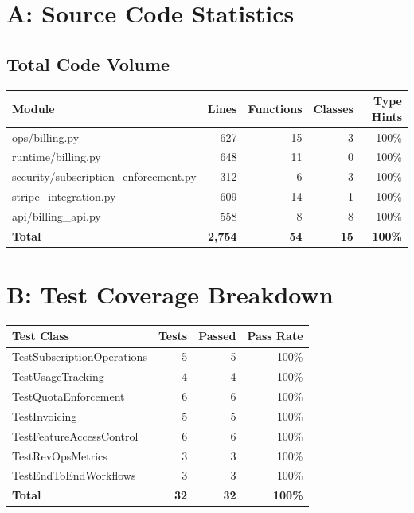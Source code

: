 \documentclass[12pt]{report}
\begin{document}
\appendix

\chapter{A: Source Code Statistics}

\section{Total Code Volume}

\begin{table}[h]
\centering
\begin{tabular}{lrrrr}
\toprule
\textbf{Module} & \textbf{Lines} & \textbf{Functions} & \textbf{Classes} & \textbf{Type Hints} \\
\midrule
ops/billing.py & 627 & 15 & 3 & 100\% \\
runtime/billing.py & 648 & 11 & 0 & 100\% \\
security/subscription\_enforcement.py & 312 & 6 & 3 & 100\% \\
stripe\_integration.py & 609 & 14 & 1 & 100\% \\
api/billing\_api.py & 558 & 8 & 8 & 100\% \\
\bottomrule
\textbf{Total} & \textbf{2,754} & \textbf{54} & \textbf{15} & \textbf{100\%} \\
\bottomrule
\end{tabular}
\end{table}

\chapter{B: Test Coverage Breakdown}

\begin{table}[h]
\centering
\begin{tabular}{lrrr}
\toprule
\textbf{Test Class} & \textbf{Tests} & \textbf{Passed} & \textbf{Pass Rate} \\
\midrule
TestSubscriptionOperations & 5 & 5 & 100\% \\
TestUsageTracking & 4 & 4 & 100\% \\
TestQuotaEnforcement & 6 & 6 & 100\% \\
TestInvoicing & 5 & 5 & 100\% \\
TestFeatureAccessControl & 6 & 6 & 100\% \\
TestRevOpsMetrics & 3 & 3 & 100\% \\
TestEndToEndWorkflows & 3 & 3 & 100\% \\
\bottomrule
\textbf{Total} & \textbf{32} & \textbf{32} & \textbf{100\%} \\
\bottomrule
\end{tabular}
\end{table}
\end{document}
